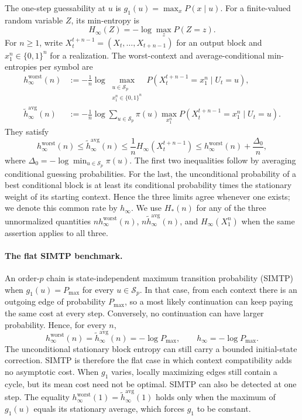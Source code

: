 \documentclass[11pt,a4paper]{article}
\begin{document}
The one-step guessability at $u$ is $g_1(u)=\max_xP(x\mid u)$.
For a finite-valued random variable $Z$, its min-entropy is
\[
    H_\infty(Z)=-\log\max_zP(Z=z).
\]
For $n\ge1$, write $X_t^{t+n-1}=(X_t,\ldots,X_{t+n-1})$ for an
output block and $x_1^n\in\{0,1\}^n$ for a realization.
The worst-context and average-conditional min-entropies per symbol are
\begin{align}
    h_\infty^{\mathrm{worst}}(n)
    &:=-\frac1n\log\max_{\substack{u\in\mathcal S_p\\x_1^n\in\{0,1\}^n}}
       P(X_t^{t+n-1}=x_1^n\mid U_t=u),
    \label{eq:worst_rate}\\
    \widetilde h_\infty^{\mathrm{avg}}(n)
    &:=-\frac1n\log\sum_{u\in\mathcal S_p}\pi(u)
       \max_{x_1^n}P(X_t^{t+n-1}=x_1^n\mid U_t=u).
    \label{eq:avg_rate}
\end{align}
They satisfy
\begin{equation}
\label{eq:block_sandwich}
    h_\infty^{\mathrm{worst}}(n)
    \le \widetilde h_\infty^{\mathrm{avg}}(n)
    \le \frac1nH_\infty(X_t^{t+n-1})
    \le h_\infty^{\mathrm{worst}}(n)+\frac{\Delta_0}{n},
\end{equation}
where $\Delta_0=-\log\min_{u\in\mathcal S_p}\pi(u)$.  The first two
inequalities follow by averaging conditional guessing probabilities.
For the last, the unconditional probability of a best conditional
block is at least its conditional probability times the stationary
weight of its starting context.  Hence the three limits agree whenever
one exists; we denote this common rate by $h_\infty$.
We use $H_*(n)$ for any of the three unnormalized quantities
$n h_\infty^{\mathrm{worst}}(n)$,
$n\widetilde h_\infty^{\mathrm{avg}}(n)$, and $H_\infty(X_1^n)$
when the same assertion applies to all three.

\paragraph{The flat SIMTP benchmark.}
An order-$p$ chain is state-independent maximum transition probability
(SIMTP) when $g_1(u)=P_{\max}$ for every $u\in\mathcal S_p$.  In that
case, from each context there is an outgoing edge of probability
$P_{\max}$, so a most likely continuation can keep paying the same cost
at every step.  Conversely, no continuation can have larger
probability.  Hence, for every $n$,
\begin{equation}
\label{eq:simtp_benchmark}
    h_\infty^{\mathrm{worst}}(n)
    =\widetilde h_\infty^{\mathrm{avg}}(n)
    =-\log P_{\max},
    \qquad
    h_\infty=-\log P_{\max}.
\end{equation}
The unconditional stationary block entropy can still carry a bounded
initial-state correction.  SIMTP is therefore the flat case in which
context compatibility adds no asymptotic cost.  When $g_1$ varies,
locally maximizing edges still contain a cycle, but its mean cost
need not be optimal.  SIMTP can also be detected at one step.  The equality
$h_\infty^{\mathrm{worst}}(1)=\widetilde
h_\infty^{\mathrm{avg}}(1)$ holds only when the maximum of $g_1(u)$
equals its stationary average, which forces $g_1$ to be constant.
\end{document}
